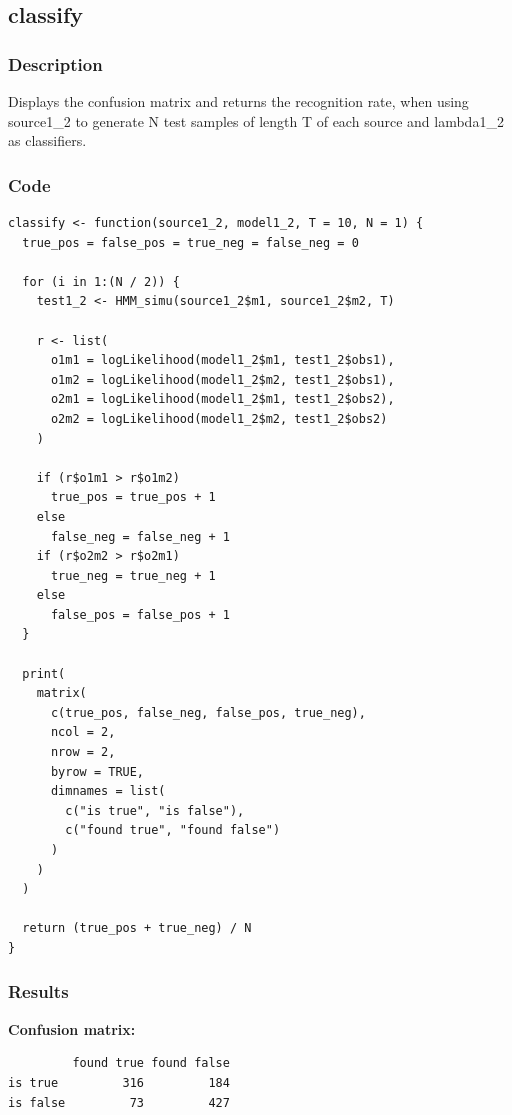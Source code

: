 \documentclass[a4paper]{article}
\begin{document}
\subsection{classify}

\subsubsection{Description}
Displays the confusion matrix and returns the recognition rate, when using source1\_2 to generate N test samples of length T of each source and lambda1\_2 as classifiers.

\subsubsection{Code}

\begin{lstlisting}
classify <- function(source1_2, model1_2, T = 10, N = 1) {
  true_pos = false_pos = true_neg = false_neg = 0
  
  for (i in 1:(N / 2)) {
    test1_2 <- HMM_simu(source1_2$m1, source1_2$m2, T)
    
    r <- list(
      o1m1 = logLikelihood(model1_2$m1, test1_2$obs1),
      o1m2 = logLikelihood(model1_2$m2, test1_2$obs1),
      o2m1 = logLikelihood(model1_2$m1, test1_2$obs2),
      o2m2 = logLikelihood(model1_2$m2, test1_2$obs2)
    )
    
    if (r$o1m1 > r$o1m2)
      true_pos = true_pos + 1
    else
      false_neg = false_neg + 1
    if (r$o2m2 > r$o2m1)
      true_neg = true_neg + 1
    else
      false_pos = false_pos + 1
  }
  
  print(
    matrix(
      c(true_pos, false_neg, false_pos, true_neg),
      ncol = 2,
      nrow = 2,
      byrow = TRUE,
      dimnames = list(
        c("is true", "is false"), 
        c("found true", "found false")
      )
    )
  )
  
  return (true_pos + true_neg) / N
}
\end{lstlisting}

\subsubsection{Results}

\textbf{Confusion matrix:}

\begin{lstlisting}
         found true found false
is true         316         184
is false         73         427
\end{lstlisting}
\end{document}
